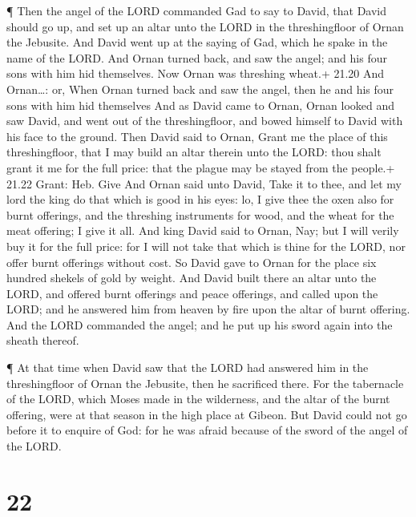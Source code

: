  ¶ Then the angel of the LORD commanded Gad to say to
David, that David should go up, and set up an altar unto the LORD in the
threshingfloor of Ornan the Jebusite.  And David went up at
the saying of Gad, which he spake in the name of the LORD. 
And Ornan turned back, and saw the angel; and his four sons with him hid
themselves. Now Ornan was threshing wheat.+ 21.20 And Ornan\ldots: or,
When Ornan turned back and saw the angel, then he and his four sons with
him hid themselves  And as David came to Ornan, Ornan
looked and saw David, and went out of the threshingfloor, and bowed
himself to David with his face to the ground.  Then David
said to Ornan, Grant me the place of this threshingfloor, that I may
build an altar therein unto the LORD: thou shalt grant it me for the
full price: that the plague may be stayed from the people.+ 21.22 Grant:
Heb. Give  And Ornan said unto David, Take it to thee, and
let my lord the king do that which is good in his eyes: lo, I give thee
the oxen also for burnt offerings, and the threshing instruments for
wood, and the wheat for the meat offering; I give it all. 
And king David said to Ornan, Nay; but I will verily buy it for the full
price: for I will not take that which is thine for the LORD, nor offer
burnt offerings without cost.  So David gave to Ornan for
the place six hundred shekels of gold by weight.  And David
built there an altar unto the LORD, and offered burnt offerings and
peace offerings, and called upon the LORD; and he answered him from
heaven by fire upon the altar of burnt offering.  And the
LORD commanded the angel; and he put up his sword again into the sheath
thereof.

 ¶ At that time when David saw that the LORD had answered
him in the threshingfloor of Ornan the Jebusite, then he sacrificed
there.  For the tabernacle of the LORD, which Moses made in
the wilderness, and the altar of the burnt offering, were at that season
in the high place at Gibeon.  But David could not go before
it to enquire of God: for he was afraid because of the sword of the
angel of the LORD.

\hypertarget{section-21}{%
\section{22}\label{section-21}}

